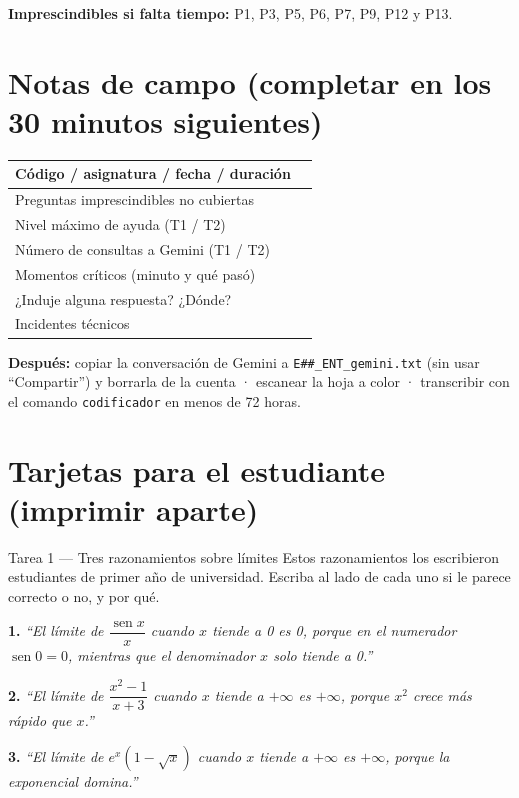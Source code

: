 \documentclass[11pt,letterpaper]{article}
\begin{document}
\textbf{Imprescindibles si falta tiempo:} P1, P3, P5, P6, P7, P9, P12 y P13.

\newpage
\section*{Notas de campo \small(completar en los 30 minutos siguientes)}
\renewcommand{\arraystretch}{1.8}
\begin{tabularx}{\linewidth}{|p{5.2cm}|X|}
\hline
Código / asignatura / fecha / duración & \\ \hline
Preguntas imprescindibles no cubiertas & \\ \hline
Nivel máximo de ayuda (T1 / T2) & \\ \hline
Número de consultas a Gemini (T1 / T2) & \\ \hline
Momentos críticos (minuto y qué pasó) & \\[1.6cm] \hline
¿Induje alguna respuesta? ¿Dónde? & \\[1cm] \hline
Incidentes técnicos & \\ \hline
\end{tabularx}

\medskip
\textbf{Después:} copiar la conversación de Gemini a \texttt{E\#\#\_ENT\_gemini.txt} (sin usar ``Compartir'') y borrarla de la cuenta · escanear la hoja a color · transcribir con el comando \texttt{codificador} en menos de 72 horas.

\newpage
\section*{Tarjetas para el estudiante \small(imprimir aparte)}

\begin{tarea}{Tarea 1 --- Tres razonamientos sobre límites}
Estos razonamientos los escribieron estudiantes de primer año de universidad. Escriba al lado de cada uno si le parece correcto o no, y por qué.

\medskip
\textbf{1.} \emph{``El límite de $\dfrac{\operatorname{sen} x}{x}$ cuando $x$ tiende a 0 es 0, porque en el numerador $\operatorname{sen} 0 = 0$, mientras que el denominador $x$ solo tiende a 0.''}

\medskip
\textbf{2.} \emph{``El límite de $\dfrac{x^2 - 1}{x + 3}$ cuando $x$ tiende a $+\infty$ es $+\infty$, porque $x^2$ crece más rápido que $x$.''}

\medskip
\textbf{3.} \emph{``El límite de $e^{x}\left(1 - \sqrt{x}\right)$ cuando $x$ tiende a $+\infty$ es $+\infty$, porque la exponencial domina.''}
\vspace{5cm}
\end{tarea}
\end{document}
